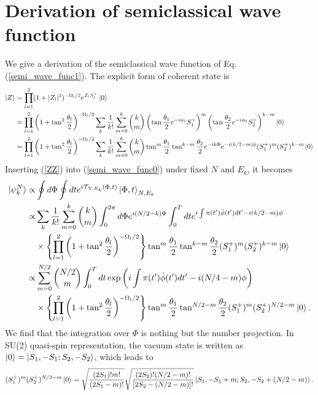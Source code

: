 \documentclass[%
superscriptaddress,
preprint,
showpacs,
nofootinbib,
amsmath,amssymb,
aps,
prc,
floatfix ]%
{revtex4-1}
\begin{document}
\appendix
\section{Derivation of semiclassical wave function}

We give a derivation of the semiclassical wave function
of Eq. (\ref{semi_wave_func1}).
The explicit form of coherent state is
\begin{align}
  \ket{Z} &= \prod_{l=1}^2(1+|Z_l|^2)^{-\Omega_l/2}e^{Z_lS_l^{+}}\ket{0} \nonumber \\
  &= \prod_{l=1}^2\left(1+\tan^2{\frac{\theta_l}{2}}\right)^{-\Omega_l/2} \sum_k \frac{1}{k!} \sum_{m=0}^k
  \binom{k}{m} \left(
  \tan{\frac{\theta_1}{2}}e^{-i\phi_1}S_1^{+} \right)^m \left(
  \tan{\frac{\theta_2}{2}}e^{-i\phi_2}S_2^{+} \right)^{k-m} \ket{0} \nonumber \\
  &= \prod_{l=1}^2\left(1+\tan^2{\frac{\theta_l}{2}}\right)^{-\Omega_l/2} \sum_k \frac{1}{k!} \sum_{m=0}^k
  \binom{k}{m} \tan^m{\frac{\theta_1}{2}}\tan^{k-m}{\frac{\theta_2}{2}}e^{-ik\Phi}e^{-i(k/2-m)\phi}
  (S_1^{+})^m(S_2^{+})^{k-m} \ket{0}
  \label{ZZ}
\end{align} 
Inserting (\ref{ZZ}) into (\ref{semi_wave_func0}) under fixed $N$ and $E_k$,
it becomes
\begin{align}
	\ket{\psi_k^N} \propto& \oint d\Phi \oint dt
	e^{i\mathcal{T}_{N,E_k}(\Phi, t)}
	\ket{\Phi,t}_{N,E_k} \nonumber \\
  \propto& \sum_k \frac{1}{k!} \sum_{m=0}^k \binom{k}{m} \int_0^{2\pi} d\Phi e^{i(N/2-k)\Phi} 
  \int_0^T dt e^{i\int \pi(t') \dot{\phi}(t') dt'-i(k/2-m)\phi} \nonumber \\
  &\times \left\{ \prod_{l=1}^2\left(1+\tan^2{\frac{\theta_l}{2}}\right)^{-\Omega_l/2} \right\}
\tan^m{\frac{\theta_1}{2}}\tan^{k-m}\frac{\theta_2}{2}(S_1^{+})^m(S_2^{+})^{k-m} \ket{0} \nonumber \\
  \propto& \sum_{m=0}^{N/2} \binom{N/2}{m} \int_0^T dt \exp{\left( i\int \pi(t') \dot{\phi}(t') dt'-i(N/4-m)\phi \right)} \nonumber \\
  &\times \left\{ \prod_{l=1}^2\left(1+\tan^2{\frac{\theta_l}{2}}\right)^{-\Omega_l/2} \right\} 
\tan^m{\frac{\theta_1}{2}}\tan^{N/2-m}\frac{\theta_2}{2} (S_1^{+})^m(S_2^{+})^{N/2-m} \ket{0} . \label{semi_wave_func_b}
\end{align}
We find that the integration over $\Phi$ is nothing but the number projection.
In SU(2) quasi-spin representation, the vacuum state is written as
$\ket{0}=\ket{S_1,-S_1;S_2,-S_2}$, which leads to
\begin{align}
  (S_1^{+})^m(S_2^{+})^{N/2-m} \ket{0} 
  = \sqrt{\frac{(2S_1)!m!}{(2S_1-m)!}} \sqrt{\frac{(2S_2)!(N/2-m)!}{[2S_2-(N/2-m)]!}}
  \ket{S_1,-S_1+m;S_2,-S_2+(N/2-m)}.
\end{align}
\end{document}
